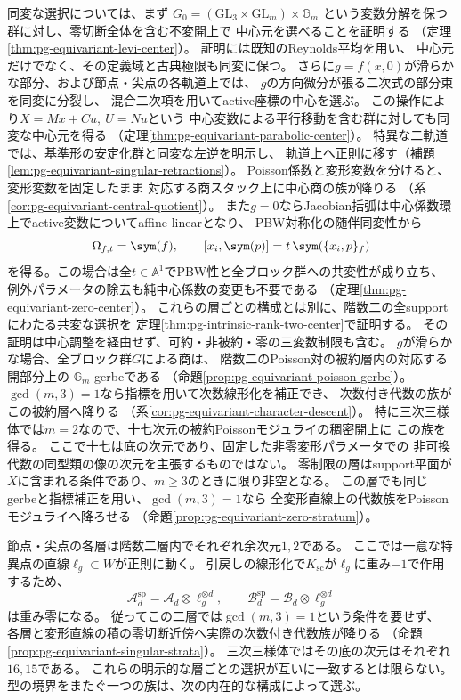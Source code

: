 同変な選択については、まず
$G_0=(\mathrm{GL}_3\times\mathrm{GL}_m)\times\mathbb G_m$
という変数分解を保つ群に対し、零切断全体を含む不変開上で
中心元を選べることを証明する
（定理\ref{thm:pg-equivariant-levi-center}）。
証明には既知のReynolds平均を用い、
中心元だけでなく、その定義域と古典極限も同変に保つ。
さらに$g=f(x,0)$が滑らかな部分、および節点・尖点の各軌道上では、
$g$の方向微分が張る二次式の部分束を同変に分裂し、
混合二次項を用いてactive座標の中心を選ぶ。
この操作により$X=Mx+Cu,\ U=Nu$という
中心変数による平行移動を含む群に対しても同変な中心元を得る
（定理\ref{thm:pg-equivariant-parabolic-center}）。
特異な二軌道では、基準形の安定化群と同変な左逆を明示し、
軌道上へ正則に移す（補題\ref{lem:pg-equivariant-singular-retractions}）。
Poisson係数と変形変数を分けると、変形変数を固定したまま
対応する商スタック上に中心商の族が降りる
（系\ref{cor:pg-equivariant-central-quotient}）。
また$g=0$ならJacobian括弧は中心係数環上でactive変数についてaffine-linearとなり、
PBW対称化の随伴同変性から
\begin{equation}\label{eq:intro-zero-restriction-center}
 \Omega_{f,t}=\sym(f),\qquad
 [x_i,\sym(p)]=t\,\sym(\{x_i,p\}_f)
\end{equation}
を得る。この場合は全$t\in\mathbb A^1$でPBW性と全ブロック群への共変性が成り立ち、
例外パラメータの除去も純中心係数の変更も不要である
（定理\ref{thm:pg-equivariant-zero-center}）。
これらの層ごとの構成とは別に、階数二の全supportにわたる共変な選択を
定理\ref{thm:pg-intrinsic-rank-two-center}で証明する。
その証明は中心調整を経由せず、可約・非被約・零の三変数制限も含む。
$g$が滑らかな場合、全ブロック群$G$による商は、
階数二のPoisson対の被約層内の対応する開部分上の
$\mathbb G_m$-gerbeである
（命題\ref{prop:pg-equivariant-poisson-gerbe}）。
$\gcd(m,3)=1$なら指標を用いて次数線形化を補正でき、
次数付き代数の族がこの被約層へ降りる
（系\ref{cor:pg-equivariant-character-descent}）。
特に三次三様体では$m=2$なので、十七次元の被約Poissonモジュライの稠密開上に
この族を得る。
ここで十七は底の次元であり、固定した非零変形パラメータでの
非可換代数の同型類の像の次元を主張するものではない。
零制限の層はsupport平面が$X$に含まれる条件であり、$m\ge3$のときに限り非空となる。
この層でも同じgerbeと指標補正を用い、$\gcd(m,3)=1$なら
全変形直線上の代数族をPoissonモジュライへ降ろせる
（命題\ref{prop:pg-equivariant-zero-stratum}）。

節点・尖点の各層は階数二層内でそれぞれ余次元$1,2$である。
ここでは一意な特異点の直線$\ell_g\subset W$が正則に動く。
引戻しの線形化で$K_{\mathrm{sc}}$が$\ell_g$に重み$-1$で作用するため、
\begin{equation}\label{eq:intro-singular-point-descent}
 \mathcal A_d^{\mathrm{sp}}=\mathcal A_d\otimes\ell_g^{\otimes d},
 \qquad
 \mathcal B_d^{\mathrm{sp}}=\mathcal B_d\otimes\ell_g^{\otimes d}
\end{equation}
は重み零になる。
従ってこの二層では$\gcd(m,3)=1$という条件を要せず、
各層と変形直線の積の零切断近傍へ実際の次数付き代数族が降りる
（命題\ref{prop:pg-equivariant-singular-strata}）。
三次三様体ではその底の次元はそれぞれ$16,15$である。
これらの明示的な層ごとの選択が互いに一致するとは限らない。
型の境界をまたぐ一つの族は、次の内在的な構成によって選ぶ。

